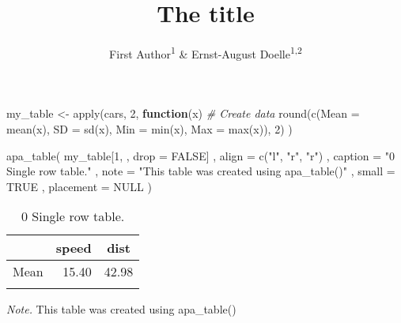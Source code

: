 \documentclass[
  english,
  man,floatsintext]{apa6}
\title{The title}
\author{First Author\textsuperscript{1} \& Ernst-August Doelle\textsuperscript{1,2}}
\date{}
\affiliation{\vspace{0.5cm}\textsuperscript{1} Wilhelm-Wundt-University\\\textsuperscript{2} Konstanz Business School}
\newenvironment{Shaded}{\begin{snugshade}}{\end{snugshade}}
\newcommand{\AttributeTok}[1]{\textcolor[rgb]{0.77,0.63,0.00}{#1}}
\newcommand{\CommentTok}[1]{\textcolor[rgb]{0.56,0.35,0.01}{\textit{#1}}}
\newcommand{\ConstantTok}[1]{\textcolor[rgb]{0.00,0.00,0.00}{#1}}
\newcommand{\ControlFlowTok}[1]{\textcolor[rgb]{0.13,0.29,0.53}{\textbf{#1}}}
\newcommand{\DecValTok}[1]{\textcolor[rgb]{0.00,0.00,0.81}{#1}}
\newcommand{\FunctionTok}[1]{\textcolor[rgb]{0.00,0.00,0.00}{#1}}
\newcommand{\NormalTok}[1]{#1}
\newcommand{\OtherTok}[1]{\textcolor[rgb]{0.56,0.35,0.01}{#1}}
\newcommand{\StringTok}[1]{\textcolor[rgb]{0.31,0.60,0.02}{#1}}
\begin{document}
\maketitle

\begin{Shaded}
\begin{Highlighting}[]
\NormalTok{my\_table }\OtherTok{\textless{}{-}} \FunctionTok{apply}\NormalTok{(cars, }\DecValTok{2}\NormalTok{, }\ControlFlowTok{function}\NormalTok{(x) }\CommentTok{\# Create data}
  \FunctionTok{round}\NormalTok{(}\FunctionTok{c}\NormalTok{(}\AttributeTok{Mean =} \FunctionTok{mean}\NormalTok{(x), }\AttributeTok{SD =} \FunctionTok{sd}\NormalTok{(x), }\AttributeTok{Min =} \FunctionTok{min}\NormalTok{(x), }\AttributeTok{Max =} \FunctionTok{max}\NormalTok{(x)), }\DecValTok{2}\NormalTok{)}
\NormalTok{)}

\FunctionTok{apa\_table}\NormalTok{(}
\NormalTok{  my\_table[}\DecValTok{1}\NormalTok{, , }\AttributeTok{drop =} \ConstantTok{FALSE}\NormalTok{]}
\NormalTok{  , }\AttributeTok{align =} \FunctionTok{c}\NormalTok{(}\StringTok{"l"}\NormalTok{, }\StringTok{"r"}\NormalTok{, }\StringTok{"r"}\NormalTok{)}
\NormalTok{  , }\AttributeTok{caption =} \StringTok{"0 Single row table."}
\NormalTok{  , }\AttributeTok{note =} \StringTok{"This table was created using apa\_table()"}
\NormalTok{  , }\AttributeTok{small =} \ConstantTok{TRUE}
\NormalTok{  , }\AttributeTok{placement =} \ConstantTok{NULL}
\NormalTok{)}
\end{Highlighting}
\end{Shaded}

\begin{table}

\begin{center}
\begin{threeparttable}

\caption{\label{tab:unnamed-chunk-2}0 Single row table.}

\small{

\begin{tabular}{lrr}
\toprule
 & \multicolumn{1}{c}{speed} & \multicolumn{1}{c}{dist}\\
\midrule
Mean & 15.40 & 42.98\\
\bottomrule
\addlinespace
\end{tabular}

}

\begin{tablenotes}[para]
\normalsize{\textit{Note.} This table was created using apa\_table()}
\end{tablenotes}

\end{threeparttable}
\end{center}

\end{table}
\end{document}
